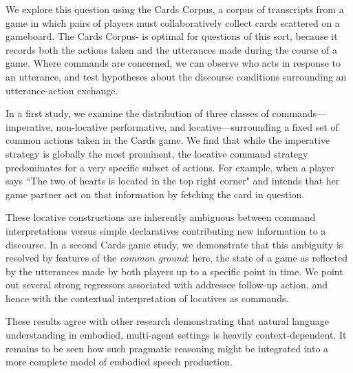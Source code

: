\documentclass[11pt,a4paper]{article}
\begin{document}
We explore this question using the Cards Corpus, a corpus of transcripts from a game in which pairs of players must collaboratively collect cards scattered on a gameboard. The Cards Corpus- is optimal for questions of this sort, because it records both the actions taken and the utterances made during the course of a game. Where commands are concerned, we can observe who acts in response to an utterance, and test hypotheses about the discourse conditions surrounding an utterance-action exchange.

In a first study, we examine the distribution of three classes of commands---imperative, non-locative performative, and locative---surrounding a fixed set of common actions taken in the Cards game. We find that while the imperative strategy 
is globally the most prominent, the locative command strategy predominates for a very specific subset of actions. For example, when a player says ``The two of hearts is located in the top right corner" and intends that her game partner act on that information by fetching the card in question.

These locative constructions are inherently ambiguous between command interpretations versus simple declaratives contributing new information to a discourse. In a second Cards game study, we demonstrate that this ambiguity is resolved by features of the \textit{common ground}: here, the state of a game as reflected by the utterances made by both players up to a specific point in time. We point out several strong regressors associated with addressee follow-up action, and hence with the contextual interpretation of locatives as commands.

These results agree with other research demonstrating that natural language understanding in embodied, multi-agent settings is heavily context-dependent. 
It remains to be seen how such pragmatic reasoning might be integrated into a more complete model of embodied speech production.
\end{document}
